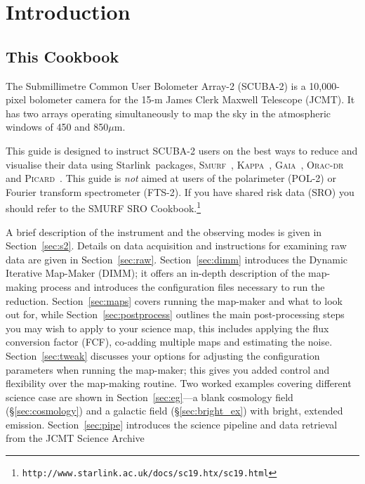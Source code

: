 \documentclass[twoside,11pt]{article}
\newcommand{\htmladdnormallink}[2]{#1}
\newcommand{\htmlref}[2]{#1}
\newenvironment{latexonly}{}{}
\newcommand{\latex}[1]{#1}
\newcommand{\latexhtml}[2]{#1}
\newcommand{\xref}[3]{#1}
\newcommand{\xlabel}[1]{}
\renewcommand{\_}{\texttt{\symbol{95}}}
\newcommand{\starlink}{\htmladdnormallink{Starlink}{http://starlink.jach.hawaii.edu}}
\newcommand{\gaia}{\xref{\textsc{Gaia}}{sun214}{}}
\newcommand{\Kappa}{\xref{\textsc{Kappa}}{sun95}{}}
\newcommand{\oracdr}{\htmladdnormallink{\textsc{Orac-dr}}{http://www.oracdr.org/oracdr}}
\newcommand{\picard}{\xref{\textsc{Picard}}{sun265}{}}
\newcommand{\smurf}{\xref{\textsc{Smurf}}{sun258}{}}
\newcommand{\cref}[3]{\latexhtml{#1~\ref{#2}}{\htmlref{#3}{#2}}}
\renewcommand{\thepage}{\roman{page}}
\begin{document}
\cleardoublepage
\renewcommand{\thepage}{\arabic{page}}
\setcounter{page}{1}

\section{\xlabel{introduction}Introduction}
\label{sec:intro}

\subsection{\xlabel{using_guide}This Cookbook}

The Submillimetre Common User Bolometer Array-2 (SCUBA-2) is a
10,000-pixel bolometer camera for the 15-m James Clerk Maxwell
Telescope (JCMT). It has two arrays operating simultaneously to map
the sky in the atmospheric windows of 450 and 850$\mu$m.

This guide is designed to instruct SCUBA-2 users on the best ways to
reduce and visualise their data using \starlink\ packages,
\smurf\ \cite{smurf}, \Kappa\ \cite{kappa}, \gaia\ \cite{gaia}, \oracdr\ \cite{oracdr} and \picard\
\cite{picard}. This guide is {\em not} aimed at users of the
polarimeter (POL-2) or Fourier transform spectrometer (FTS-2). If you
have shared risk data (SRO) you should refer to the
\xref{SMURF SRO
Cookbook.}{sc19}{}\latex{\footnote{\texttt{http://www.starlink.ac.uk/docs/sc19.htx/sc19.html}}}

A brief description of the instrument and the observing modes is given
in \cref{Section}{sec:s2}{an Overview}. Details on data acquisition and
instructions for examining raw data are given in
\cref{Section}{sec:raw}{Raw SCUBA-2 data}.
\cref{Section}{sec:dimm}{This page} introduces the Dynamic Iterative Map-Maker
(DIMM); it offers an in-depth description of the map-making
process and introduces the configuration files necessary to run the
reduction. \cref{Section}{sec:maps}{Reducing your Data} covers running
the map-maker and what to look out for, while
\cref{Section}{sec:postprocess}{Post-processing Reduction Steps}
outlines the main post-processing steps you may wish to apply to your
science map, this includes applying the flux conversion
factor (FCF), co-adding multiple maps and estimating the noise.
\cref{Section}{sec:tweak}{Tweaking the configuration file}
discusses your options for adjusting the configuration
parameters when running the map-maker; this gives you added control
and flexibility over the map-making routine. Two worked examples
covering different science case are shown in
\cref{Section}{sec:eg}{Examples}---a
\htmlref{blank cosmology field}{sec:cosmology}
\begin{latexonly}
(\S\ref{sec:cosmology})
\end{latexonly}
and a \htmlref{galactic field}{sec:bright_ex}
\begin{latexonly}
(\S\ref{sec:bright_ex})
\end{latexonly}
with bright, extended emission.
\cref{Section}{sec:pipe}{SCUBA-2 Pipeline} introduces the science
pipeline and data retrieval from the
\htmladdnormallink{JCMT Science Archive}{http://www3.cadc-ccda.hia-iha.nrc-cnrc.gc.ca/jcmt/}
\end{document}
